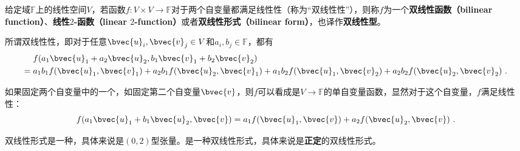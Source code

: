 


给定域$\mathbb{F}$上的线性空间$V$，若函数$f:V\times V\to \mathbb{F}$对于两个自变量都满足线性性（称为“双线性性”），则称$f$为一个\textbf{双线性函数（bilinear function）}、\textbf{线性$2$-函数（linear $2$-function）}或者\textbf{双线性形式（bilinear form）}，也译作\textbf{双线性型}。


所谓双线性性，即对于任意$\bvec{u}_i, \bvec{v}_j\in V$和$a_i, b_j\in\mathbb{F}$，都有
\begin{equation}
\begin{aligned}
&f(a_1\bvec{u}_1+a_2\bvec{u}_2, b_1\bvec{v}_1+b_2\bvec{v}_2)\\
={}& a_1b_1f(\bvec{u}_1, \bvec{v}_1)+a_2b_1f(\bvec{u}_2, \bvec{v}_1)+a_1b_2f(\bvec{u}_1, \bvec{v}_2)+a_2b_2f(\bvec{u}_2, \bvec{v}_2)~. 
\end{aligned}
\end{equation}

如果固定两个自变量中的一个，如固定第二个自变量$\bvec{v}$，则$f$可以看成是$V\to \mathbb{F}$的单自变量函数，显然对于这个自变量，$f$满足线性性：
\begin{equation}
f(a_1\bvec{u}_1+b_1\bvec{u}_2, \bvec{v})=a_1f(\bvec{u}_1, \bvec{v})+a_2f(\bvec{u}_2, \bvec{v})~. 
\end{equation}






双线性形式是一种，具体来说是$(0, 2)$型张量。是一种双线性形式，具体来说是\textbf{正定}的双线性形式。


















